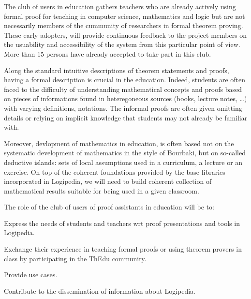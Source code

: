 \begin{workpackage}[id=dissemination,wphases=0-48,type=MGT,
  short=Dissemination,%
  title={Dissemination, communication and exploitation},
  lead=Inr]
\begin{tasklist}
  \begin{task}[id=teachers-club,
      title=Expanding the use of Logipedia in education,
      lead=Str,StrRM=2] The club of users in education gathers
    teachers who are already actively using formal proof for teaching
    in computer science, mathematics and logic but are not necessarily
    members of the cummunity of researchers in formal theorem
    proving. These early adopters, will provide continuous feedback to
    the project members on the usuability and accessibility of the
    system from this particular point of view.  More than 15 persons
    have already accepted to take part in this club.

    Along the standard intuitive descriptions of theorem statements
    and proofs, having a formal description is crucial in the
    education. Indeed, students are often faced to the difficulty of
    understanding mathematical concepts and proofs based on pieces of
    informations found in heteregoneous sources (books, lecture notes,
    \ldots) with varying definitions, notations. The informal proofs
    are often given omitting details or relying on implicit knowledge
    that students may not already be familiar with.

    Moreover, devlopment of mathematics in education, is often based
    not on the systematic development of mathematics in the style of
    Bourbaki, but on so-called deductive islands: sets of local
    assumptions used in a curriculum, a lecture or an exercise.  On
    top of the coherent foundations provided by the base libraries
    incorporated in Logipedia, we will need to build coherent
    collection of mathematical results suitable for being used in a
    given classroom.

    The role of the club of users of proof assistants in education will be to:
    \begin{compactitem}
    \item Express the needs of students and teachers wrt proof
      presentations and tools in Logipedia.
    \item Exchange their experience in teaching formal proofs or using
      theorem provers in class by participating in the ThEdu community.
    \item Provide use cases.
    \item Contribute to the dissemination of information about Logipedia.
    \end{compactitem}


\end{task}
\end{tasklist}
\end{workpackage}
